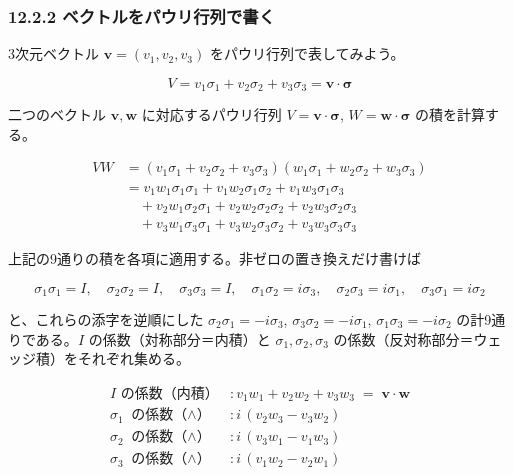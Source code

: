 \documentclass[a4paper,12pt,openany]{book}
\begin{document}
\hypertarget{ux30d9ux30afux30c8ux30ebux3092ux30d1ux30a6ux30eaux884cux5217ux3067ux66f8ux304f}{%
\subsubsection{12.2.2
ベクトルをパウリ行列で書く}\label{ux30d9ux30afux30c8ux30ebux3092ux30d1ux30a6ux30eaux884cux5217ux3067ux66f8ux304f}}

3次元ベクトル \(\mathbf{v} = (v_1, v_2, v_3)\)
をパウリ行列で表してみよう。

\[V = v_1\sigma_1 + v_2\sigma_2 + v_3\sigma_3 = \mathbf{v}\!\cdot\!\bm{\sigma}\]

二つのベクトル \(\mathbf{v}, \mathbf{w}\) に対応するパウリ行列
\(V = \mathbf{v}\!\cdot\!\bm{\sigma}\),
\(W = \mathbf{w}\!\cdot\!\bm{\sigma}\) の積を計算する。

\[
\begin{aligned}
VW &= (v_1\sigma_1 + v_2\sigma_2 + v_3\sigma_3)(w_1\sigma_1 + w_2\sigma_2 + w_3\sigma_3) \\[4pt]
&= v_1w_1\sigma_1\sigma_1 + v_1w_2\sigma_1\sigma_2 + v_1w_3\sigma_1\sigma_3 \\
&\quad + v_2w_1\sigma_2\sigma_1 + v_2w_2\sigma_2\sigma_2 + v_2w_3\sigma_2\sigma_3 \\
&\quad + v_3w_1\sigma_3\sigma_1 + v_3w_2\sigma_3\sigma_2 + v_3w_3\sigma_3\sigma_3
\end{aligned}
\]

上記の9通りの積を各項に適用する。非ゼロの置き換えだけ書けば

\[
\sigma_1\sigma_1 = I,\quad \sigma_2\sigma_2 = I,\quad \sigma_3\sigma_3 = I,\quad
\sigma_1\sigma_2 = i\sigma_3,\quad \sigma_2\sigma_3 = i\sigma_1,\quad \sigma_3\sigma_1 = i\sigma_2
\]

と、これらの添字を逆順にした \(\sigma_2\sigma_1 = -i\sigma_3\),
\(\sigma_3\sigma_2 = -i\sigma_1\), \(\sigma_1\sigma_3 = -i\sigma_2\)
の計9通りである。\(I\) の係数（対称部分＝内積）と
\(\sigma_1,\sigma_2,\sigma_3\)
の係数（反対称部分＝ウェッジ積）をそれぞれ集める。

\[
\begin{aligned}
I\text{ の係数（内積）} &: v_1w_1 + v_2w_2 + v_3w_3 \;=\; \mathbf{v}\!\cdot\!\mathbf{w} \\
\sigma_1\text{ の係数（$\wedge$）} &: i\,(v_2w_3 - v_3w_2) \\
\sigma_2\text{ の係数（$\wedge$）} &: i\,(v_3w_1 - v_1w_3) \\
\sigma_3\text{ の係数（$\wedge$）} &: i\,(v_1w_2 - v_2w_1)
\end{aligned}
\]
\end{document}
